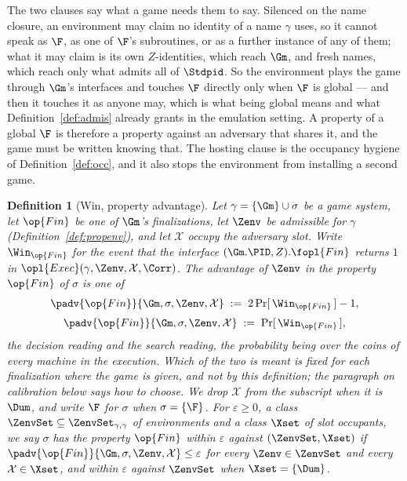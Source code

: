 \documentclass[10pt,oneside,openany]{book}
\theoremstyle{accentdef}
\newtheorem{definition}{Definition}[chapter]
\theoremstyle{accentplain}
\begin{document}
The two clauses say what a game needs them to say. Silenced on the name closure, an environment may
claim no identity of a name $\gamma$ uses, so it cannot speak as $\F$, as one of $\F$'s subroutines,
or as a further instance of any of them; what it may claim is its own $Z$-identities, which reach
$\Gm$, and fresh names, which reach only what admits all of $\Stdpid$. So the environment plays the
game through $\Gm$'s interfaces and touches $\F$ directly only when $\F$ is global --- and then it
touches it as anyone may, which is what being global means and what
Definition~\ref{def:admis} already grants in the emulation setting. A property of a global $\F$ is
therefore a property against an adversary that shares it, and the game must be written knowing that.
The hosting clause is the occupancy hygiene of Definition~\ref{def:occ}, and it also stops the
environment from installing a second game.

\begin{definition}[Win, property advantage]\label{def:propadv}
Let $\gamma = \{\Gm\} \cup \sigma$ be a game system, let $\op{Fin}$ be one of $\Gm$'s
finalizations, let $\Zenv$ be admissible for $\gamma$ (Definition~\ref{def:propenv}), and let
$\mathcal{X}$ occupy the adversary slot. Write $\Win_{\op{Fin}}$ for the event that the interface
$(\Gm.\PID,Z).\fopl{Fin}$ returns $1$ in $\opl{Exec}(\gamma,\Zenv,\mathcal{X},\Corr)$. The
\emph{advantage} of $\Zenv$ in the property $\op{Fin}$ of $\sigma$ is one of
\[
  \begin{gathered}
  \padv{\op{Fin}}{\Gm,\sigma,\Zenv,\mathcal{X}} \;:=\; 2\Pr[\,\Win_{\op{Fin}}\,] - 1 , \\[3pt]
  \padv{\op{Fin}}{\Gm,\sigma,\Zenv,\mathcal{X}} \;:=\; \Pr[\,\Win_{\op{Fin}}\,] ,
  \end{gathered}
\]
the \emph{decision} reading and the \emph{search} reading, the probability being over the coins of
every machine in the execution. Which of the two is meant is fixed for each finalization where the
game is given, and not by this definition; the paragraph on calibration below says how to choose.
We drop $\mathcal{X}$ from the subscript when it is $\Dum$, and write $\F$ for $\sigma$ when
$\sigma = \{\F\}$. For $\varepsilon \geq 0$, a
class $\ZenvSet \subseteq \ZenvSet_{\gamma,\gamma}$ of environments and a class $\Xset$ of slot
occupants, we say $\sigma$ has the property $\op{Fin}$ \emph{within $\varepsilon$ against}
$(\ZenvSet,\Xset)$ if
$\padv{\op{Fin}}{\Gm,\sigma,\Zenv,\mathcal{X}} \leq \varepsilon$ for every $\Zenv \in \ZenvSet$ and
every $\mathcal{X} \in \Xset$, and \emph{within $\varepsilon$ against $\ZenvSet$} when
$\Xset = \{\Dum\}$.
\end{definition}
\end{document}
